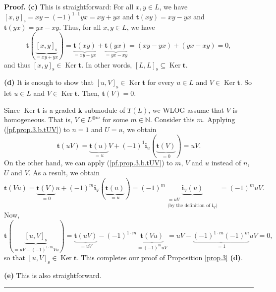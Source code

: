 \documentclass[numbers=enddot,12pt,final,onecolumn,notitlepage]{scrartcl}%
\theoremstyle{definition}
\newenvironment{proof}[1][Proof]{\noindent\textbf{#1.} }{\ \rule{0.5em}{0.5em}}
\begin{document}
\begin{proof}
\textbf{(c)} This is straightforward: For all $x,y\in L$, we have $\left[
x,y\right]  _{\operatorname*{s}}=xy-\left(  -1\right)  ^{1\cdot1}yx=xy+yx$ and
$\mathbf{t}\left(  xy\right)  =xy-yx$ and $\mathbf{t}\left(  yx\right)
=yx-xy$. Thus, for all $x,y\in L$, we have%
\[
\mathbf{t}\left(  \underbrace{\left[  x,y\right]  _{\operatorname*{s}}%
}_{=xy+yx}\right)  =\underbrace{\mathbf{t}\left(  xy\right)  }_{=xy-yx}%
+\underbrace{\mathbf{t}\left(  yx\right)  }_{=yx-xy}=\left(  xy-yx\right)
+\left(  yx-xy\right)  =0,
\]
and thus $\left[  x,y\right]  _{\operatorname*{s}}\in\operatorname*{Ker}%
\mathbf{t}$. In other words, $\left[  L,L\right]  _{\operatorname*{s}%
}\subseteq\operatorname*{Ker}\mathbf{t}$. \medskip

\textbf{(d)} It is enough to show that $\left[  u,V\right]
_{\operatorname*{s}}\in\operatorname*{Ker}\mathbf{t}$ for every $u\in L$ and
$V\in\operatorname*{Ker}\mathbf{t}$. So let $u\in L$ and $V\in
\operatorname*{Ker}\mathbf{t}$. Then, $\mathbf{t}\left(  V\right)  =0$.

Since $\operatorname*{Ker}\mathbf{t}$ is a graded $\mathbf{k}$-submodule of
$T\left(  L\right)  $, we WLOG assume that $V$ is homogeneous. That is, $V\in
L^{\otimes m}$ for some $m\in\mathbb{N}$. Consider this $m$. Applying
(\ref{pf.prop.3.b.tUV}) to $n=1$ and $U=u$, we obtain%
\[
\mathbf{t}\left(  uV\right)  =\underbrace{\mathbf{t}\left(  u\right)  }%
_{=u}V+\left(  -1\right)  ^{1}\mathbf{i}_{u}\left(  \underbrace{\mathbf{t}%
\left(  V\right)  }_{=0}\right)  =uV.
\]
On the other hand, we can apply (\ref{pf.prop.3.b.tUV}) to $m$, $V$ and $u$
instead of $n$, $U$ and $V$. As a result, we obtain%
\[
\mathbf{t}\left(  Vu\right)  =\underbrace{\mathbf{t}\left(  V\right)  }%
_{=0}u+\left(  -1\right)  ^{m}\mathbf{i}_{V}\left(  \underbrace{\mathbf{t}%
\left(  u\right)  }_{=u}\right)  =\left(  -1\right)  ^{m}%
\underbrace{\mathbf{i}_{V}\left(  u\right)  }_{\substack{=uV\\\text{(by the
definition of }\mathbf{i}_{V}\text{)}}}=\left(  -1\right)  ^{m}uV.
\]
Now,
\[
\mathbf{t}\left(  \underbrace{\left[  u,V\right]  _{\operatorname*{s}}%
}_{=uV-\left(  -1\right)  ^{1\cdot m}Vu}\right)  =\underbrace{\mathbf{t}%
\left(  uV\right)  }_{=uV}-\left(  -1\right)  ^{1\cdot m}%
\underbrace{\mathbf{t}\left(  Vu\right)  }_{=\left(  -1\right)  ^{m}%
uV}=uV-\underbrace{\left(  -1\right)  ^{1\cdot m}\left(  -1\right)  ^{m}}%
_{=1}uV=0,
\]
so that $\left[  u,V\right]  _{\operatorname*{s}}\in\operatorname*{Ker}%
\mathbf{t}$. This completes our proof of Proposition \ref{prop.3}
\textbf{(d)}. \medskip

\textbf{(e)} This is also straightforward.
\end{proof}
\end{document}

